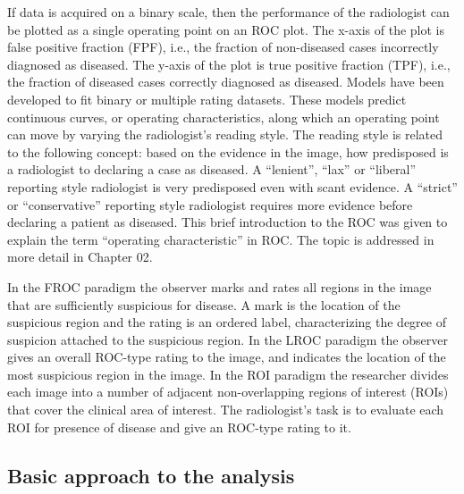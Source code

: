 \documentclass[
]{book}
\begin{document}
If data is acquired on a binary scale, then the performance of the radiologist can be plotted as a single operating point on an ROC plot. The x-axis of the plot is false positive fraction (FPF), i.e., the fraction of non-diseased cases incorrectly diagnosed as diseased. The y-axis of the plot is true positive fraction (TPF), i.e., the fraction of diseased cases correctly diagnosed as diseased. Models have been developed to fit binary or multiple rating datasets. These models predict continuous curves, or operating characteristics, along which an operating point can move by varying the radiologist's reading style. The reading style is related to the following concept: based on the evidence in the image, how predisposed is a radiologist to declaring a case as diseased. A ``lenient'', ``lax'' or ``liberal'' reporting style radiologist is very predisposed even with scant evidence. A ``strict'' or ``conservative'' reporting style radiologist requires more evidence before declaring a patient as diseased. This brief introduction to the ROC was given to explain the term ``operating characteristic'' in ROC. The topic is addressed in more detail in Chapter 02.

In the FROC paradigm the observer marks and rates all regions in the image that are sufficiently suspicious for disease. A mark is the location of the suspicious region and the rating is an ordered label, characterizing the degree of suspicion attached to the suspicious region. In the LROC paradigm the observer gives an overall ROC-type rating to the image, and indicates the location of the most suspicious region in the image. In the ROI paradigm the researcher divides each image into a number of adjacent non-overlapping regions of interest (ROIs) that cover the clinical area of interest. The radiologist's task is to evaluate each ROI for presence of disease and give an ROC-type rating to it.

\hypertarget{basic-approach-to-the-analysis}{%
\subsection{Basic approach to the analysis}\label{basic-approach-to-the-analysis}}
\end{document}
